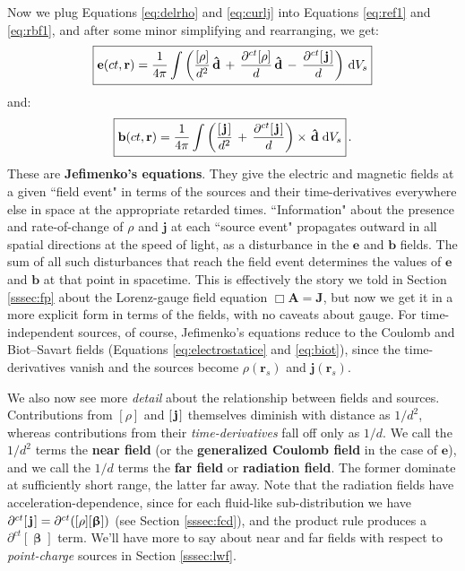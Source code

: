 \documentclass[12pt]{article}
\renewcommand{\vv}[1]{\mathbf{#1}}
\newcommand{\dd}[1]{\mathrm{d}#1}
\newcommand{\vvbeta}{\bm{\upbeta}}
\begin{document}
Now we plug Equations \ref{eq:delrho} and \ref{eq:curlj} into Equations \ref{eq:ref1} and \ref{eq:rbf1}, and after some minor simplifying and rearranging, we get:
\begin{equation}\label{eq:ref2}
\boxed{
\vv e(ct, \vv r) = \dfrac{1}{4 \pi} \int \left( \dfrac{[\rho]}{d^2} \, \vv{\hat{d}}  \, + \, \dfrac{\partial^{ct} [\rho] }{d} \, \vv{\hat{d}} \, -  \, \dfrac{ \partial^{ct} [\mkern2mu \vv j \mkern1.5mu ]}{d} \right) \, \dd V_{s}
}
\end{equation}
and:
\begin{equation}\label{eq:rbf2}
\boxed{
\vv b(ct, \vv r) = \dfrac{1}{4 \pi} \int \left( \dfrac{[\mkern2mu \vv j \mkern1.5mu ] }{d^2} \, + \, \dfrac{ \partial^{ct} [\mkern2mu \vv j \mkern1.5mu ] }{d} \right) \times \mkern2mu \vv{\hat{d}} \; \dd V_{s}
} \, .
\end{equation}
These are \textbf{Jefimenko's equations}. They give the electric and magnetic fields at a given ``field event" in terms of the sources and their time-derivatives everywhere else in space at the appropriate retarded times. ``Information" about the presence and rate-of-change of $\rho$ and $\vv j$ at each ``source event" propagates outward in all spatial directions at the speed of light, as a disturbance in the $\vv e$ and $\vv b$ fields. The sum of all such disturbances that reach the field event determines the values of $\vv e$ and $\vv b$ at that point in spacetime. This is effectively the story we told in Section \ref{sssec:fp} about the Lorenz-gauge field equation $\Box \vv A = \vv J$, but now we get it in a more explicit form in terms of the fields, with no caveats about gauge. For time-independent sources, of course, Jefimenko's equations reduce to the Coulomb and Biot--Savart fields (Equations \ref{eq:electrostatice} and \ref{eq:biot}), since the time-derivatives vanish and the sources become $\rho (\vv r_{s})$ and $\vv j (\vv r_{s})$.

We also now see more \emph{detail} about the relationship between fields and sources. Contributions from $[\rho]$ and $[\mkern2mu \vv j \mkern1.5mu]$ themselves diminish with distance as $1/d^2$, whereas contributions from their \emph{time-derivatives} fall off only as $1/d$. We call the $1/d^2$ terms the \textbf{near field} (or the \textbf{generalized Coulomb field} in the case of $\vv e$), and we call the $1/d$ terms the \textbf{far field} or \textbf{radiation field}. The former dominate at sufficiently short range, the latter far away. Note that the radiation fields have acceleration-dependence, since for each fluid-like sub-distribution we have $\partial^{ct} [\mkern2mu \vv j \mkern1.5mu] = \partial^{ct} ([\rho][\vvbeta])$ (see Section \ref{sssec:fcd}), and the product rule produces a $\partial^{ct} [\vvbeta]$ term. We'll have more to say about near and far fields with respect to \emph{point-charge} sources in Section \ref{sssec:lwf}.
\end{document}

